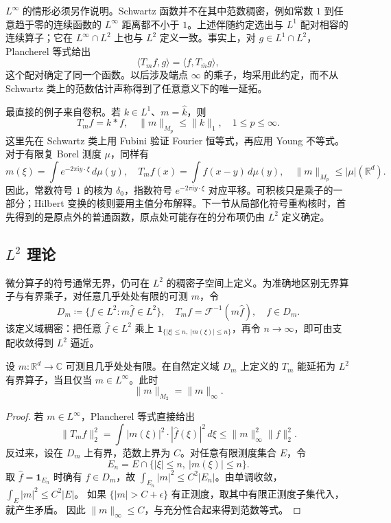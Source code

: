 \ProseParagraphBreak
\(L^\infty\) 的情形必须另作说明。Schwartz 函数并不在其中范数稠密，例如常数 \(1\) 到任意趋于零的连续函数的 \(L^\infty\) 距离都不小于 \(1\)。上述伴随约定选出与 \(L^1\) 配对相容的 \WeakStar{}连续算子；它在 \(L^\infty\cap L^2\) 上也与 \(L^2\) 定义一致。事实上，对 \(g\in L^1\cap L^2\)，Plancherel 等式给出
\[
 \langle T_m f,g\rangle
 =\langle f,T_{\overline m}g\rangle,
\]
这个配对确定了同一个函数。以后涉及端点 \(\infty\) 的乘子，均采用此约定，而不从 Schwartz 类上的范数估计声称得到了任意意义下的唯一延拓。

\ProseParagraphBreak
最直接的例子来自卷积。若 \(k\in L^1\)、\(m=\widehat k\)，则
\[
 T_m f=k*f,\quad
 \|m\|_{M_p}\leq\|k\|_1,\quad 1\leq p\leq\infty.
\]
这里先在 Schwartz 类上用 Fubini 验证 Fourier 恒等式，再应用 Young 不等式。对于有限复 Borel 测度 \(\mu\)，同样有
\[
 m(\xi)=\int e^{-2\pi\mathrm i y\cdot\xi}\,d\mu(y),
 \quad T_m f(x)=\int f(x-y)\,d\mu(y),
 \quad \|m\|_{M_p}\leq|\mu|(\mathbb R^d).
\]
因此，常数符号 \(1\) 的核为 \(\delta_0\)，指数符号
\(e^{-2\pi\mathrm i y\cdot\xi}\) 对应平移。可积核只是乘子的一部分；Hilbert 变换的核则要用主值分布解释。下一节从局部化符号重构核时，首先得到的是原点外的普通函数，原点处可能存在的分布项仍由 \(L^2\) 定义确定。

\subsection{\texorpdfstring{\(L^2\)}{L2} 理论}
\label{b2:subsec:220102}

微分算子的符号通常无界，仍可在 \(L^2\) 的稠密子空间上定义。为准确地区别无界算子与有界乘子，对任意几乎处处有限的可测 \(m\)，令
\[
 D_m\coloneqq\{f\in L^2:m\widehat f\in L^2\},
 \quad T_m f=\mathcal F^{-1}(m\widehat f),\quad f\in D_m.
\]
该定义域稠密：把任意 \(\widehat f\in L^2\) 乘上
\(\mathbf1_{\{|\xi|\leq n,\ |m(\xi)|\leq n\}}\)，再令 \(n\to\infty\)，即可由支配收敛得到 \(L^2\) 逼近。

\begin{proposition}\label{b2:prop:22-l2}
设 \(m:\mathbb R^d\to\mathbb C\) 可测且几乎处处有限。在自然定义域
\(D_m\) 上定义的 \(T_m\) 能延拓为 \(L^2\) 有界算子，当且仅当
\(m\in L^\infty\)。此时
\[
 \|m\|_{M_2}=\|m\|_\infty.
\]
\end{proposition}
\begin{proof}
若 \(m\in L^\infty\)，Plancherel 等式直接给出
\[
 \|T_m f\|_2^2=\int|m(\xi)|^2\cdot|\widehat f(\xi)|^2\,d\xi
 \leq\|m\|_\infty^2\|f\|_2^2.
\]
反过来，设在 \(D_m\) 上有界，范数上界为 \(C\)。对任意有限测度集合 \(E\)，令
\[
 E_n=E\cap\{|\xi|\leq n,\ |m(\xi)|\leq n\}.
\]
取 \(\widehat f=\mathbf1_{E_n}\) 时确有 \(f\in D_m\)，故
\(\int_{E_n}|m|^2\leq C^2|E_n|\)。由单调收敛，
\(\int_E|m|^2\leq C^2|E|\)。
如果 \(\{|m|>C+\epsilon\}\) 有正测度，取其中有限正测度子集代入，就产生矛盾。
因此 \(\|m\|_\infty\leq C\)，与充分性合起来得到范数等式。
\end{proof}

